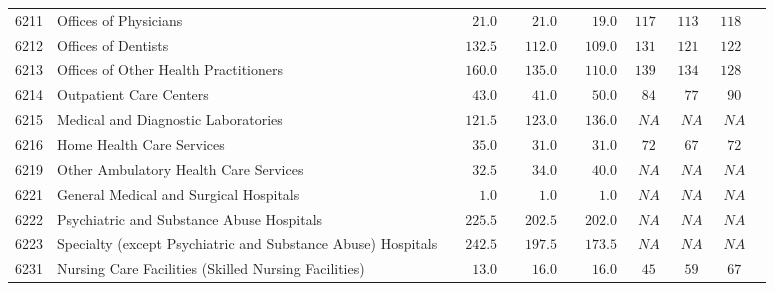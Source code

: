 \documentclass[9pt, oneside]{article}   	%
\begin{document}
\begin{longtable}{lp{3.5 in}ccccccc}
6211  & Offices of Physicians & $\phantom{000}21.0$ & $\phantom{000}21.0$ & $\phantom{000}19.0$ & $117$ & $113$ & $118$ \\
6212  & Offices of Dentists & $\phantom{00}132.5$ & $\phantom{00}112.0$ & $\phantom{00}109.0$ & $131$ & $121$ & $122$ \\
6213  & Offices of Other Health Practitioners & $\phantom{00}160.0$ & $\phantom{00}135.0$ & $\phantom{00}110.0$ & $139$ & $134$ & $128$ \\
6214  & Outpatient Care Centers & $\phantom{000}43.0$ & $\phantom{000}41.0$ & $\phantom{000}50.0$ & $\phantom{0}84$ & $\phantom{0}77$ & $\phantom{0}90$ \\
6215  & Medical and Diagnostic Laboratories & $\phantom{00}121.5$ & $\phantom{00}123.0$ & $\phantom{00}136.0$ & $\phantom{0}NA$ & $\phantom{0}NA$ & $\phantom{0}NA$ \\
6216  & Home Health Care Services & $\phantom{000}35.0$ & $\phantom{000}31.0$ & $\phantom{000}31.0$ & $\phantom{0}72$ & $\phantom{0}67$ & $\phantom{0}72$ \\
6219  & Other Ambulatory Health Care Services & $\phantom{000}32.5$ & $\phantom{000}34.0$ & $\phantom{000}40.0$ & $\phantom{0}NA$ & $\phantom{0}NA$ & $\phantom{0}NA$ \\
6221  & General Medical and Surgical Hospitals & $\phantom{0000}1.0$ & $\phantom{0000}1.0$ & $\phantom{0000}1.0$ & $\phantom{0}NA$ & $\phantom{0}NA$ & $\phantom{0}NA$ \\
6222  & Psychiatric and Substance Abuse Hospitals & $\phantom{00}225.5$ & $\phantom{00}202.5$ & $\phantom{00}202.0$ & $\phantom{0}NA$ & $\phantom{0}NA$ & $\phantom{0}NA$ \\
6223  & Specialty (except Psychiatric and Substance Abuse) Hospitals & $\phantom{00}242.5$ & $\phantom{00}197.5$ & $\phantom{00}173.5$ & $\phantom{0}NA$ & $\phantom{0}NA$ & $\phantom{0}NA$ \\
6231  & Nursing Care Facilities (Skilled Nursing Facilities) & $\phantom{000}13.0$ & $\phantom{000}16.0$ & $\phantom{000}16.0$ & $\phantom{0}45$ & $\phantom{0}59$ & $\phantom{0}67$ \\

\end{longtable}
\end{document}
